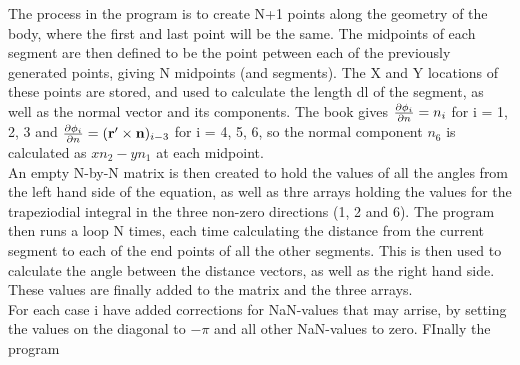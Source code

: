 \documentclass[a4paper,english,11pt,twoside]{article}
\begin{document}
The process in the program is to create N+1 points along the geometry of the body, where the first and last point will be the same. The midpoints of each segment are then defined to be the point petween each of the previously generated points, giving N midpoints (and segments). The X and Y locations of these points are stored, and used to calculate the length dl of the segment, as well as the normal vector and its components. The book gives $\frac{\partial \phi_i}{\partial n} = n_i$ for i = 1, 2, 3 and $\frac{\partial \phi_i}{\partial n} = (\mathbf{r'} \times \mathbf{n})_{i-3}$ for i = 4, 5, 6, so the normal component $n_6$ is calculated as $xn_2 - yn_1$ at each midpoint.\\

An empty N-by-N matrix is then created to hold the values of all the angles from the left hand side of the equation, as well as thre arrays holding the values for the trapeziodial integral in the three non-zero directions (1, 2 and 6). The program then runs a loop N times, each time calculating the distance from the current segment to each of the end points of all the other segments. This is then used to calculate the angle between the distance vectors, as well as the right hand side. These values are finally added to the matrix and the three arrays.\\

For each case i have added corrections for NaN-values that may arrise, by setting the values on the diagonal to $-\pi$ and all other NaN-values to zero. FInally the program 


\newpage
\end{document}
